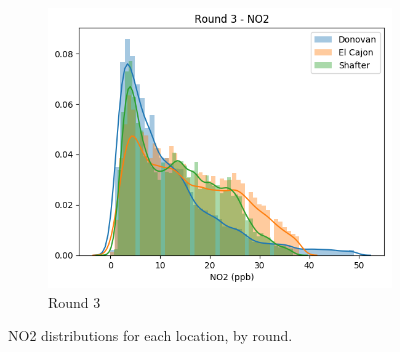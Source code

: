 \documentclass[journal abbreviation, manuscript]{copernicus}
\begin{document}
\begin{figure}[H]
\begin{subfigure}{0.32\textwidth}
\includegraphics[width=\textwidth]{results/distributions/round3_no2.png}
\caption{Round 3}
\end{subfigure}
\caption{NO2 distributions for each location, by round.}
\label{fig:no2-rounds}
\end{figure}

\iffalse
\end{document}
